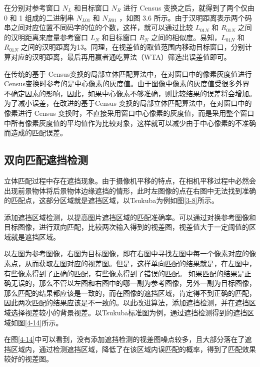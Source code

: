 在分别对参考窗口 $N_{L}$ 和目标窗口 $N_{R}$ 进行 Census 变换之后，就得到了两个仅由 0 和 1 组成的二进制串 $N_{L01}$ 和 $N_{R01}$ ，如图 3.6 所示。由于汉明距离表示两个码串之间对应位置不同码字的位的个数，这样，就可以通过比较 $L_{01N}$ 和 $R_{01N}$ 之间的汉明距离来度量参考窗口 $L_{N}$ 和目标窗口 $R_{N}$ 之间的相似度。易知，$L_{01N}$ 和 $R_{01N}$ 之间的汉明距离为13。同理，在视差值的取值范围内移动目标窗口，分别计算对应的汉明距离，最后再用赢者通吃算法（WTA）筛选出误差值即可。

在传统的基于 Census变换的局部立体匹配算法中，在对窗口中的像素灰度值进行 Census变换时参考的是中心像素的灰度值。由于图像中像素的灰度值受很多外界不确定因素的影响，因此，如果中心像素不够准确，则比较结果的误差将会增加。为了减小误差，在改进的基于Census 变换的局部立体匹配算法中，在对窗口中的像素进行 Census 变换时，不直接采用窗口中心像素的灰度值，而是采用整个窗口中所有像素灰度值的平均值作为比较对象，这样就可以减少由于中心像素的不准确而造成的匹配误差。 

\subsection{双向匹配遮挡检测}

立体匹配过程中存在遮挡现象。由于摄像机平移的特点，在相机平移过程中必然会出现前景物体将后景物体边缘遮挡的情形，此时左图像的点在右图中无法找到准确的匹配点，这部分区域就是遮挡区域，以Tsukuba为例如图\ref{3-8}所示。


添加遮挡区域检测，以提高图片遮挡区域的匹配准确率。可以通过对换参考图像和目标图像，进行双向匹配，比较两次输入得到的视差图，视差值大于一定阈值的区域就是遮挡区域。

以左图为参考图像，右图为目标图像，即在右图中寻找左图中每一个像素对应的像素点，从而获取左图对应的视差图。但是，这样单向匹配的结果就是，在左图中，有些像素得到了正确的匹配，有些像素得到了错误的匹配。 如果匹配的结果是正确无误的，那么不管以左图和右图中的哪一副为参考图像，另外一副为目标图像，那么匹配的结果都应该是一致的，而在图像的遮挡区域，肯定得不到正确的匹配，因此两次匹配的结果应该是不一致的。以此改进算法，添加遮挡检测，并在遮挡区域选择视差较小的背景视差。以Tsukuba标准图为例，通过遮挡检测得到的遮挡区域如图\ref{4-14}所示。


在图\ref{4-14}中可以看到，没有添加遮挡检测的视差图噪点较多，且大部分落在了遮挡区域内，通过检测遮挡区域，降低了在该区域内误匹配的概率，得到了匹配效果较好的视差图。

